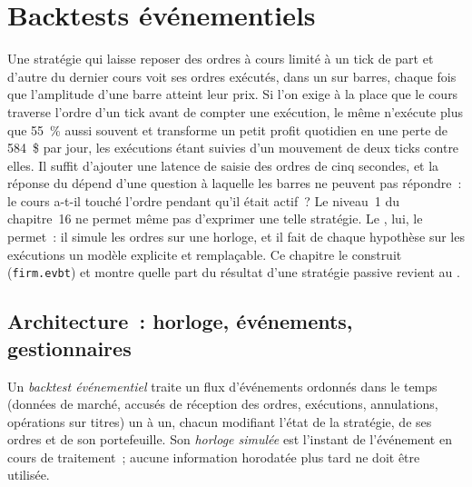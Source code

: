 \chapter{Backtests événementiels}\label{ch:rs:event-driven-backtests}

Une stratégie qui laisse reposer des ordres à cours limité à un tick de part et d'autre du dernier cours voit ses ordres exécutés, dans un  sur barres, chaque fois que l'amplitude d'une barre atteint
leur prix. Si l'on exige à la place que le cours traverse l'ordre d'un tick avant de compter une exécution, le même  n'exécute plus que 55~\% aussi souvent et transforme
un petit profit quotidien en une perte de 584~\$ par jour, les exécutions étant suivies d'un mouvement de deux ticks contre elles. Il suffit d'ajouter une latence de saisie des ordres de cinq secondes,
et la réponse du  dépend d'une question à laquelle les barres ne peuvent pas répondre~: le cours a-t-il touché l'ordre pendant qu'il était actif~? Le niveau~1 du
chapitre~16 ne permet même pas d'exprimer une telle stratégie. Le , lui, le permet~: il simule les ordres sur une horloge, et il fait de chaque hypothèse
sur les exécutions un modèle explicite et remplaçable. Ce chapitre le construit (\texttt{firm.evbt}) et montre quelle part du résultat d'une stratégie passive revient au
.

\section{Architecture~: horloge, événements, gestionnaires}

\begin{definition}\label{def:rs:event-driven-backtests:evbt}
Un \emph{backtest événementiel} traite un flux d'événements ordonnés dans le temps (données de marché, accusés de réception des ordres,
exécutions, annulations, opérations sur titres) un à un, chacun modifiant l'état de la stratégie, de ses ordres et de son portefeuille. Son
\emph{horloge simulée} est l'instant de l'événement en cours de traitement~; aucune information horodatée plus tard ne doit être utilisée.
\end{definition}

